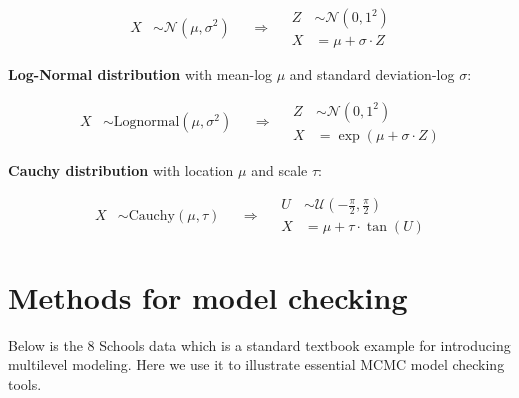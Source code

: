 \documentclass[11pt, oneside, openany]{scrbook}
\begin{document}

\begin{equation}
  \begin{split}
    X &\sim \mathcal{N}(\mu, \sigma^2)
  \end{split}
\quad \Longrightarrow \quad
  \begin{split}
    Z &\sim \mathcal{N}(0, 1^2) \\
    X &= \mu + \sigma \cdot Z
  \end{split}
\label{eq:nc-normal}
\end{equation}

\textbf{Log-Normal distribution} with mean-log \(\mu\) and standard deviation-log \(\sigma\):


\begin{equation}
  \begin{split}
    X &\sim \mathrm{Lognormal}(\mu, \sigma^2)
  \end{split}
\quad \Longrightarrow \quad
  \begin{split}
    Z &\sim \mathcal{N}(0, 1^2) \\
    X &= \exp\left(\mu + \sigma \cdot Z\right)
  \end{split}
\label{eq:nc-lognormal}
\end{equation}

\textbf{Cauchy distribution} with location \(\mu\) and scale \(\tau\):


\begin{equation}
  \begin{split}
    X &\sim \mathrm{Cauchy}(\mu, \tau)
  \end{split}
\quad \Longrightarrow \quad
  \begin{split}
    U &\sim \mathcal{U}\left(-\frac{\pi}{2}, \frac{\pi}{2}\right) \\
    X &= \mu + \tau \cdot \tan(U)
  \end{split}
\label{eq:nc-cauchy}
\end{equation}

\hypertarget{model-checking}{%
\section{Methods for model checking}\label{model-checking}}

Below is the 8 Schools data \citep{gelman2013bayesian} which is a standard textbook example for introducing multilevel modeling. Here we use it to illustrate essential MCMC model checking tools.
\end{document}
